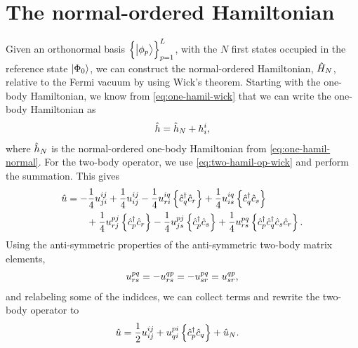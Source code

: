     \section{The normal-ordered Hamiltonian}
        Given an orthonormal basis $\left\{ \ket{\phi_p} \right\}_{p = 1}^{L}$, with the
        $N$ first states occupied in the reference state $\ket{\Phi_{0}}$, we
        can construct the normal-ordered Hamiltonian, $\hat{H}_N$, relative to
        the Fermi vacuum by using Wick's theorem.
        Starting with the one-body Hamiltonian, we know from
        \autoref{eq:one-hamil-wick} that we can write the one-body Hamiltonian
        as
        \begin{align}
            \hat{h} = \hat{h}_N + h^{i}_{i},
        \end{align}
        where $\hat{h}_N$ is the normal-ordered one-body Hamiltonian from
        \autoref{eq:one-hamil-normal}.
        For the two-body operator, we use \autoref{eq:two-hamil-op-wick} and
        perform the summation.
        This gives
        \begin{align}
            \hat{u}
            &=
            - \frac{1}{4}u^{ij}_{ji}
            + \frac{1}{4}u^{ij}_{ij}
            - \frac{1}{4}u^{iq}_{ri}\left\{ 
                \hat{c}_{q}^{\dagger}
                \hat{c}_{r}
             \right\}
            + \frac{1}{4}u^{iq}_{is}\left\{ 
                \hat{c}_{q}^{\dagger}
                \hat{c}_{s}
             \right\}
            \nonumber \\
            &\qquad
            + \frac{1}{4}u^{pj}_{rj}\left\{ 
                \hat{c}_{p}^{\dagger}
                \hat{c}_{r}
             \right\}
            - \frac{1}{4}u^{pj}_{js}\left\{ 
                \hat{c}_{p}^{\dagger}
                \hat{c}_{s}
             \right\}
            + \frac{1}{4}u^{pq}_{rs}\left\{ 
                \hat{c}_{p}^{\dagger}
                \hat{c}_{q}^{\dagger}
                \hat{c}_{s}
                \hat{c}_{r}
             \right\}.
        \end{align}
        Using the anti-symmetric properties of the anti-symmetric two-body
        matrix elements,
        \begin{align}
            u^{pq}_{rs}
            =
            -u^{qp}_{rs}
            =
            -u^{pq}_{sr}
            =
            u^{qp}_{sr},
        \end{align}
        and relabeling some of the indidces, we can collect terms and rewrite
        the two-body operator to
        \begin{align}
            \hat{u}
            &=
            \frac{1}{2} u^{ij}_{ij}
            + u^{pi}_{qi}\left\{ 
                \hat{c}_{p}^{\dagger}
                \hat{c}_{q}
             \right\}
            + \hat{u}_N.
        \end{align}
